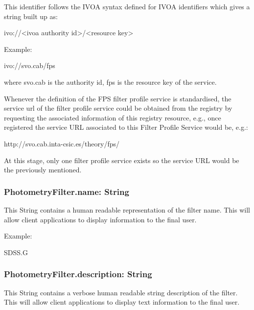 \documentclass[11pt,a4paper]{ivoa}
\begin{document}
This identifier follows the IVOA syntax defined for IVOA 
identifiers \citep{2016ivoa.spec.0523D} which gives a string built up as:
\par

ivo://<ivoa authority id>/<resource key>
\bigskip


Example:
\par

ivo://svo.cab/fps
\bigskip




where svo.cab is the authority id, fps is the resource key of the service.
\par

Whenever the definition of the FPS filter profile service is standardised,
the service url of the filter profile service could be obtained 
from the registry by requesting the associated information of this 
registry resource, e.g., once registered the service URL associated 
to this Filter Profile Service would be, e.g.:
\par

http://svo.cab.inta-csic.es/theory/fps/
\bigskip

At this stage, only one filter profile service exists so the service
URL would be the previously mentioned.

\subsubsection{PhotometryFilter.name: String}
This String contains a human readable representation of the filter 
name. This will allow client applications to display information 
to the final user.
\par

Example:
\par

SDSS.G
\bigskip




\subsubsection{PhotometryFilter.description: String}
This String contains a verbose human readable string description of the 
filter. This will allow client applications to display text information 
to the final user.
\par
\end{document}
